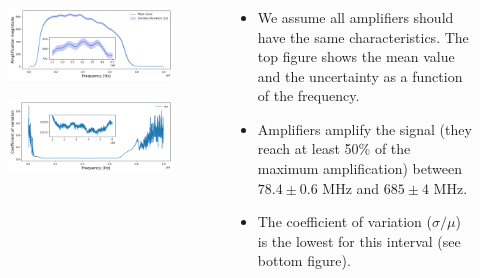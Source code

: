 \documentclass{beamer}
\begin{document}
\begin{frame}
\frametitle{}
\begin{columns}
\begin{column}{0.5\textwidth}
\begin{figure}
    \centering
    \includegraphics[width=\textwidth]{../figures/uncert.png}
\end{figure}
\begin{figure}
    \centering
    \includegraphics[width=\textwidth]{../figures/cv.png}
\end{figure}
\end{column}
\begin{column}{0.5\textwidth}
    \begin{itemize}
        \item We assume all amplifiers should have the same characteristics. The top figure shows the mean value and the uncertainty as a function of the frequency.
        \item Amplifiers amplify the signal (they reach at least 50\% of the maximum amplification) between $78.4\pm0.6$ MHz and $685\pm4$ MHz.
        \item The coefficient of variation ($\sigma/\mu$) is the lowest for this interval (see bottom figure).
    \end{itemize}
\end{column}
\end{columns}
\end{frame}
\end{document}
